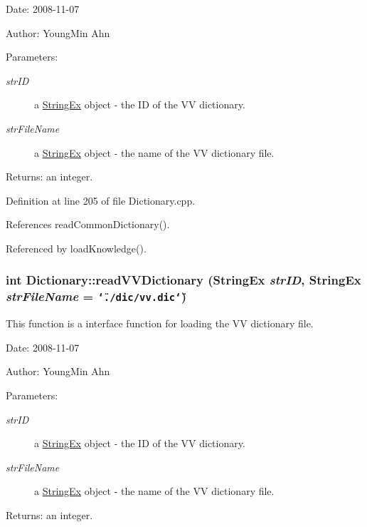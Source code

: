 \begin{Desc}
\item[Date:]2008-11-07 \end{Desc}
\begin{Desc}
\item[Author:]YoungMin Ahn \end{Desc}
\begin{Desc}
\item[Parameters:]
\begin{description}
\item[{\em strID}]a \hyperlink{classStringEx}{StringEx} object - the ID of the VV dictionary. \item[{\em strFileName}]a \hyperlink{classStringEx}{StringEx} object - the name of the VV dictionary file. \end{description}
\end{Desc}
\begin{Desc}
\item[Returns:]an integer. \end{Desc}


Definition at line 205 of file Dictionary.cpp.

References readCommonDictionary().

Referenced by loadKnowledge().\hypertarget{classkmaOrange_1_1Dictionary_5cebf5ef04e987a073ba5022d2ea71f4}{
\subsubsection[{readVVDictionary}]{\setlength{\rightskip}{0pt plus 5cm}int Dictionary::readVVDictionary ({\bf StringEx} {\em strID}, \/  {\bf StringEx} {\em strFileName} = {\tt \char`\"{}./dic/vv.dic\char`\"{}})}}
\label{classkmaOrange_1_1Dictionary_5cebf5ef04e987a073ba5022d2ea71f4}


This function is a interface function for loading the VV dictionary file. 

\begin{Desc}
\item[Date:]2008-11-07 \end{Desc}
\begin{Desc}
\item[Author:]YoungMin Ahn \end{Desc}
\begin{Desc}
\item[Parameters:]
\begin{description}
\item[{\em strID}]a \hyperlink{classStringEx}{StringEx} object - the ID of the VV dictionary. \item[{\em strFileName}]a \hyperlink{classStringEx}{StringEx} object - the name of the VV dictionary file. \end{description}
\end{Desc}
\begin{Desc}
\item[Returns:]an integer. \end{Desc}


